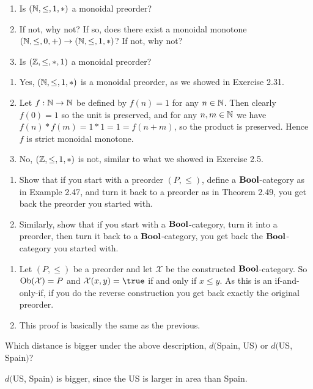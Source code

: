 \begin{enumerate}
	\item Is $(\mathbb{N}, \leq, 1, *)$ a monoidal preorder?
	\item If not, why not?  If so, does there exist a monoidal monotone $(\mathbb{N},\leq, 0, +)\to (\mathbb{N}, \leq, 1,*)$?  If not, why not?
	\item Is $(\mathbb{Z},\leq, *, 1)$ a monoidal preorder?
\end{enumerate}

\solution
\begin{enumerate}
	\item Yes, $(\mathbb{N},\leq,1,*)$ is a monoidal preorder, as we showed in Exercise 2.31.
	\item Let $f:\mathbb{N}\to\mathbb{N}$ be defined by $f(n)=1$ for any $n\in\mathbb{N}$.  Then clearly $f(0)=1$ so the unit is preserved, and for any $n,m\in\mathbb{N}$ we have $f(n)*f(m)=1*1=1=f(n+m)$, so the product is preserved.  Hence $f$ is strict monoidal monotone.
	\item No, $(\mathbb{Z},\leq,1,*)$ is not, similar to what we showed in Exercise 2.5.
\end{enumerate}

\begin{enumerate}
	\item Show that if you start with a preorder $(P,\leq)$, define a $\textbf{Bool}$-category as in Example 2.47, and turn it back to a preorder as in Theorem 2.49, you get back the preorder you started with.
	\item Similarly, show that if you start with a $\textbf{Bool}$-category, turn it into a preorder, then turn it back to a $\textbf{Bool}$-category, you get back the $\textbf{Bool}$-category you started with.
\end{enumerate}

\solution
\begin{enumerate}
	\item Let $(P,\leq)$ be a preorder and let $\mathcal{X}$ be the constructed $\textbf{Bool}$-category.  So $\textrm{Ob}(\mathcal{X})=P$ and $\mathcal{X}(x,y)=\true$ if and only if $x\leq y$.  As this is an if-and-only-if, if you do the reverse construction you get back exactly the original preorder.
	\item This proof is basically the same as the previous.
\end{enumerate}

Which distance is bigger under the above description, $d($Spain, US$)$ or $d($US, Spain$)$?

\solution
$d($US, Spain$)$ is bigger, since the US is larger in area than Spain.

